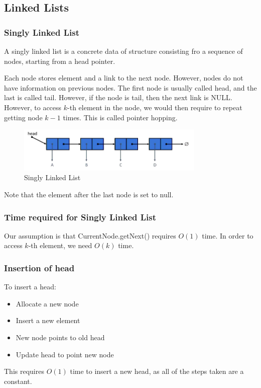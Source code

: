 \documentclass[a4paper]{article}
\theoremstyle{plain}
\theoremstyle{definition}
\newtheorem{defn}{Definition}[section]
\theoremstyle{remark}
\begin{document}
\subsection{Linked Lists \label{list}}
\subsubsection{Singly Linked List}
\begin{tcolorbox}[colback=black!3!white,colframe=black!60!white,title=\begin{defn}Singly Linked List \label{Singly Linked List}\end{defn}]
A singly linked list is a concrete data of structure consisting fro a sequence of nodes, starting from a head pointer.
\end{tcolorbox}
Each node stores element and a link to the next node. However, nodes do not have information on previous nodes. The first node is usually called head, and the last is called tail. However, if the node is tail, then the next link is NULL. However, to access $k$-th element in the node, we would then require to repeat getting node $k-1$ times. This is called pointer hopping.
\begin{figure}[H]
	\centering
	\includegraphics[width=0.8\textwidth]{figures/singlelinkedlist.png}
	\caption{Singly Linked List}
	\label{fig:figures-singlelinkedlist-png}
\end{figure}
Note that the element after the last node is set to null.
\subsubsection{Time required for Singly Linked List}
Our assumption is that CurrentNode.getNext() requires $O(1)$ time. In order to access $k$-th element, we need $O(k)$ time.
\subsubsection{Insertion of head}
To insert a head:
\begin{itemize}
	\item Allocate a new node
	\item Insert a new element
	\item New node points to old head
	\item Update head to point new node
\end{itemize}
This requires $O(1)$ time to insert a new head, as all of the steps taken are a constant. 
\end{document}
